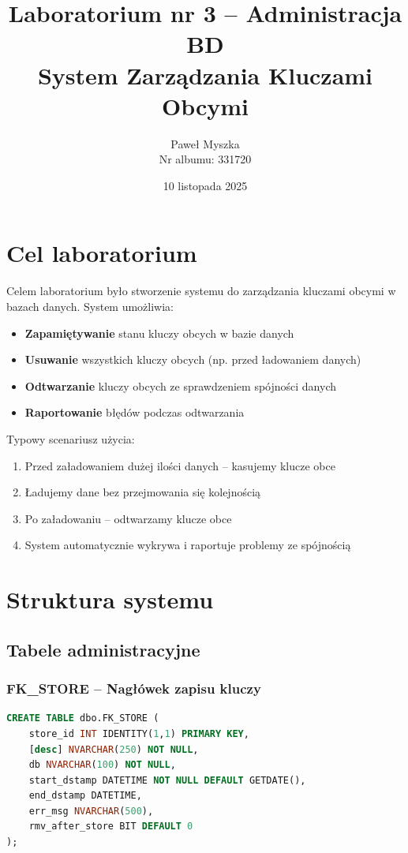 \documentclass[a4paper,11pt]{article}
\title{Laboratorium nr 3 -- Administracja BD\\
	\large System Zarządzania Kluczami Obcymi}
\author{Paweł Myszka\\
	Nr albumu: 331720}
\date{10 listopada 2025}
\begin{document}
	
	\maketitle
	\thispagestyle{fancy}
	
	\section{Cel laboratorium}
	
	Celem laboratorium było stworzenie systemu do zarządzania kluczami obcymi w bazach danych. System umożliwia:
	\begin{itemize}
		\item \textbf{Zapamiętywanie} stanu kluczy obcych w bazie danych
		\item \textbf{Usuwanie} wszystkich kluczy obcych (np. przed ładowaniem danych)
		\item \textbf{Odtwarzanie} kluczy obcych ze sprawdzeniem spójności danych
		\item \textbf{Raportowanie} błędów podczas odtwarzania
	\end{itemize}
	
	Typowy scenariusz użycia:
	\begin{enumerate}
		\item Przed załadowaniem dużej ilości danych -- kasujemy klucze obce
		\item Ładujemy dane bez przejmowania się kolejnością
		\item Po załadowaniu -- odtwarzamy klucze obce
		\item System automatycznie wykrywa i raportuje problemy ze spójnością
	\end{enumerate}
	
	\section{Struktura systemu}
	
	\subsection{Tabele administracyjne}
	
	\subsubsection{FK\_STORE -- Nagłówek zapisu kluczy}
	
	\begin{lstlisting}[language=SQL]
CREATE TABLE dbo.FK_STORE (
	store_id INT IDENTITY(1,1) PRIMARY KEY,
	[desc] NVARCHAR(250) NOT NULL,
	db NVARCHAR(100) NOT NULL,
	start_dstamp DATETIME NOT NULL DEFAULT GETDATE(),
	end_dstamp DATETIME,
	err_msg NVARCHAR(500),
	rmv_after_store BIT DEFAULT 0
);
	\end{lstlisting}
	
\end{document}

